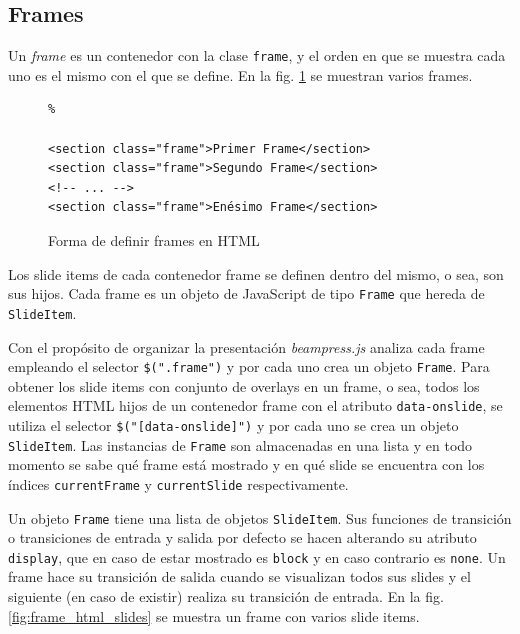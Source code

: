 
		\subsection{Frames} %
		 \label{sub:frames}
		 
		  
			Un \textit{frame} es un contenedor con la clase \texttt{frame}, y el orden en que se muestra cada uno es el mismo con el que se define. En la fig. \ref{fig:frames_html} se muestran varios frames.


				\begin{figure}[htb]%
					\begin{lstlisting}%

<section class="frame">Primer Frame</section>
<section class="frame">Segundo Frame</section>
<!-- ... -->
<section class="frame">Enésimo Frame</section>
					\end{lstlisting}
					\caption{Forma de definir frames en HTML}
					\label{fig:frames_html}
				\end{figure}

			Los slide items de cada contenedor frame se definen dentro del mismo, o sea, son sus hijos. Cada frame es un objeto de JavaScript de tipo \texttt{Frame} que hereda de \texttt{SlideItem}.


			Con el propósito de organizar la presentación \textit{beampress.js} analiza cada frame empleando el selector \texttt{\$(".frame")} y por cada uno crea un objeto \texttt{Frame}. Para obtener los slide items con conjunto de overlays en un frame, o sea, todos los elementos HTML hijos de un contenedor frame con el atributo \texttt{data-onslide}, se utiliza el selector \texttt{\$("[data-onslide]")} y por cada uno se crea un objeto \texttt{SlideItem}. Las instancias de \texttt{Frame} son almacenadas en una lista y en todo momento se sabe qué frame está mostrado y en qué slide se encuentra con los índices \texttt{currentFrame} y \texttt{currentSlide} respectivamente.

			Un objeto \texttt{Frame} tiene una lista de objetos \texttt{SlideItem}. Sus funciones de transición o transiciones de entrada y salida por defecto se hacen alterando su atributo \texttt{display}, que en caso de estar mostrado es \texttt{block} y en caso contrario es \texttt{none}. Un frame hace su transición de salida cuando se visualizan todos sus slides y el siguiente (en caso de existir) realiza su transición de entrada. En la fig. \ref{fig:frame_html_slides} se muestra un frame con varios slide items.

